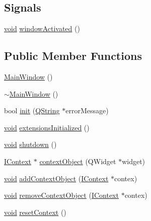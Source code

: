 \subsection*{Signals}
\begin{DoxyCompactItemize}
\item 
\hyperlink{group___u_a_v_objects_plugin_ga444cf2ff3f0ecbe028adce838d373f5c}{void} \hyperlink{group___core_plugin_gab85c6e89d3a93fa49b4210217ee55271}{window\-Activated} ()
\end{DoxyCompactItemize}
\subsection*{Public Member Functions}
\begin{DoxyCompactItemize}
\item 
\hyperlink{group___core_plugin_ga34c4b4207b46d11a4100c9b19f0e81bb}{Main\-Window} ()
\item 
\hyperlink{group___core_plugin_gae98d00a93bc118200eeef9f9bba1dba7}{$\sim$\-Main\-Window} ()
\item 
bool \hyperlink{group___core_plugin_gafd7a49e5ef33d7eb47ac7befd1acaeb5}{init} (\hyperlink{group___u_a_v_objects_plugin_gab9d252f49c333c94a72f97ce3105a32d}{Q\-String} $\ast$error\-Message)
\item 
\hyperlink{group___u_a_v_objects_plugin_ga444cf2ff3f0ecbe028adce838d373f5c}{void} \hyperlink{group___core_plugin_ga4c8ca3dfbbec662f91c1fd39467eb8ee}{extensions\-Initialized} ()
\item 
\hyperlink{group___u_a_v_objects_plugin_ga444cf2ff3f0ecbe028adce838d373f5c}{void} \hyperlink{group___core_plugin_ga1fcbdef10ebfdec100d2d0078abb5afa}{shutdown} ()
\item 
\hyperlink{class_core_1_1_i_context}{I\-Context} $\ast$ \hyperlink{group___core_plugin_gac1345c7f33f14242e6b865e1c72426a9}{context\-Object} (Q\-Widget $\ast$widget)
\item 
\hyperlink{group___u_a_v_objects_plugin_ga444cf2ff3f0ecbe028adce838d373f5c}{void} \hyperlink{group___core_plugin_gada7d20cb1e2117aa2991afa0589bdfbf}{add\-Context\-Object} (\hyperlink{class_core_1_1_i_context}{I\-Context} $\ast$contex)
\item 
\hyperlink{group___u_a_v_objects_plugin_ga444cf2ff3f0ecbe028adce838d373f5c}{void} \hyperlink{group___core_plugin_gad67194baca34bebd58c0d57847a8d576}{remove\-Context\-Object} (\hyperlink{class_core_1_1_i_context}{I\-Context} $\ast$contex)
\item 
\hyperlink{group___u_a_v_objects_plugin_ga444cf2ff3f0ecbe028adce838d373f5c}{void} \hyperlink{group___core_plugin_ga8dffd013e2adedc8c0b8700def6786f9}{reset\-Context} ()

\end{DoxyCompactItemize}
